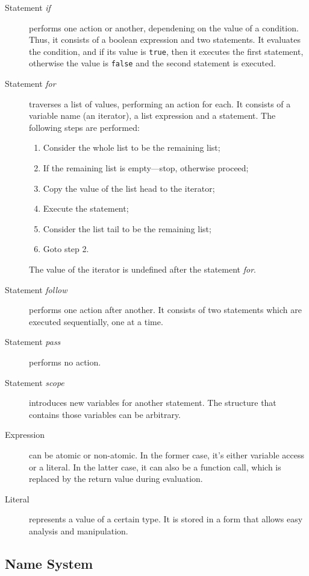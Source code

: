\documentclass [a4paper] {article}
\begin{document}
\begin {description}
\item [Statement \emph{if}] performs one action or another, dependening on the
value of a condition. Thus, it consists of a boolean expression and two
statements. It evaluates the condition, and if its value is \texttt{true}, then
it executes the first statement, otherwise the value is \texttt{false} and the
second statement is executed.

\item [Statement \emph{for}] traverses a list of values, performing an action
for each. It consists of a variable name (an iterator), a list expression and a
statement. The following steps are performed:
\begin {enumerate}
\item Consider the whole list to be the remaining list;
\item If the remaining list is empty---stop, otherwise proceed;
\item Copy the value of the list head to the iterator;
\item Execute the statement;
\item Consider the list tail to be the remaining list;
\item Goto step 2.
\end {enumerate}
The value of the iterator is undefined after the statement \emph{for}.

\item [Statement \emph{follow}] performs one action after another. It consists
of two statements which are executed sequentially, one at a time.

\item [Statement \emph{pass}] performs no action.

\item [Statement \emph{scope}] introduces new variables for another statement.
The structure that contains those variables can be arbitrary.

\item [Expression] can be atomic or non-atomic. In the former case, it's either
variable access or a literal. In the latter case, it can also be a function
call, which is replaced by the return value during evaluation.

\item [Literal] represents a value of a certain type. It is stored in a form
that allows easy analysis and manipulation.

\end {description}

\subsection { Name System }
\end{document}
